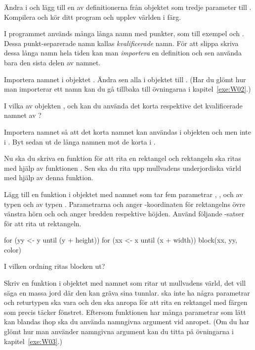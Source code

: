 \Subtask
Ändra i  och lägg till en av definitionerna från objektet  som tredje parameter till .
Kompilera och kör ditt program och upplev världen i färg.

\Task
I programmet används många långa namn med punkter, som till exempel  och .
Dessa punkt-separerade namn kallas \emph{kvalificerade} namn.
För att slippa skriva dessa långa namn hela tiden kan man \emph{importera} en definition och sen använda bara den sista delen av namnet.

\Subtask
Importera namnet  i objektet . Ändra sen alla  i objektet till .
(Har du glömt hur man importerar ett namn kan du gå tillbaka till övningarna i kapitel~\ref{exe:W02}.)

\Subtask\Pen
I vilka av objekten ,  och  kan du använda det korta respektive det kvalificerade namnet av ?

\Subtask
Importera namnet  så att det korta namnet  kan användas i objekten  och  men inte i .
Byt sedan ut de långa namnen mot de korta i .

\Task
Nu ska du skriva en funktion för att rita en rektangel och rektangeln ska ritas med hjälp av funktionen .
Sen ska du rita upp mullvadens underjordiska värld med hjälp av denna funktion.

\Subtask
Lägg till en funktion i objektet  med namnet  som tar fem parametrar , ,  och  av typen  och  av typen .
Parametrarna  och  anger -koordinaten för rektangelns övre vänstra hörn och  och  anger bredden respektive höjden.
Använd följande -satser för att rita ut rektangeln.
\begin{Code}
for (yy <- y until (y + height)) {
	for (xx <- x until (x + width)) {
		block(xx, yy, color)
	}
}
\end{Code}

\Subtask\Pen
I vilken ordning ritas blocken ut?


\Subtask
Skriv en funktion i objektet  med namnet  som ritar ut mullvadens värld, det vill säga en massa jord där den kan gräva sina tunnlar.
 ska inte ha några parametrar och returtypen ska vara  och den ska anropa  för att rita en rektangel med färgen  som precis täcker fönstret.
Eftersom funktionen har många parametrar som lätt kan blandas ihop ska du använda namngivna argument vid anropet.
(Om du har glömt hur man använder namngivna argument kan du titta på övningarna i kapitel~\ref{exe:W03}.)

